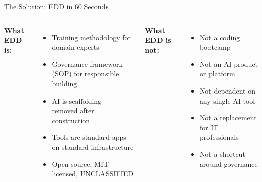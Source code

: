\documentclass[aspectratio=169,11pt]{beamer}
\newcommand{\navy}[1]{\textbf{\color{navyblue}#1}}
\begin{document}
\begin{frame}[shrink=5]{The Solution: EDD in 60 Seconds}

\begin{center}
{\normalsize
{}%
\;{\color{navyblue}$\rightarrow$}\;%
%
\;{\color{navyblue}$\rightarrow$}\;%
%
\;{\color{navyblue}$\rightarrow$}\;%
%
}
\end{center}

\vspace{6pt}

\begin{columns}[T]
\navy{What EDD is:}
\begin{itemize}
  \item Training methodology for domain experts
  \item Governance framework (SOP) for responsible building
  \item AI is scaffolding --- removed after construction
  \item Tools are standard apps on standard infrastructure
  \item Open-source, MIT-licensed, UNCLASSIFIED
\end{itemize}

\navy{What EDD is not:}
\begin{itemize}
  \item Not a coding bootcamp
  \item Not an AI product or platform
  \item Not dependent on any single AI tool
  \item Not a replacement for IT professionals
  \item Not a shortcut around governance
\end{itemize}
\end{columns}

\end{frame}
\end{document}
